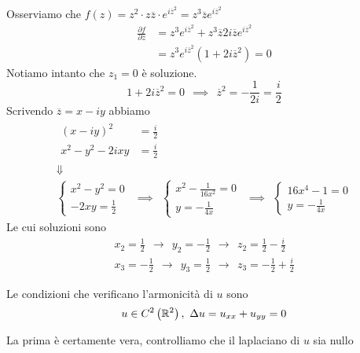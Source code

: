 Osserviamo che $f\left(z\right) = z^{2} \cdot z\overline{z} \cdot e^{i\overline{z}^{2}} = z^{3}\overline{z} e^{i\overline{z}^{2}}$
\begin{align*}
\frac{\partial f}{\partial \overline{z}} & = z^{3} e^{i\overline{z}^{2}} + z^{3}\overline{z} 2i\overline{z} e^{i\overline{z}^{2}}\\
 & = z^{3} e^{i\overline{z}^{2}}\left(1 + 2i\overline{z}^{2}\right) = 0
\end{align*}
Notiamo intanto che $z_{1} = 0$ è soluzione.
\begin{equation*}
1 + 2i\overline{z}^{2} = 0\ \ \implies \ \ \overline{z}^{2} = - \frac{1}{2i} = \frac{i}{2}
\end{equation*}
Scrivendo $\overline{z} = x - iy$ abbiamo
\begin{gather*}
\begin{aligned}
\left(x - iy\right)^{2} & = \frac{i}{2}\\
x^{2} - y^{2} - 2ixy & = \frac{i}{2}
\end{aligned}\\
\Downarrow \\
\begin{cases}
x^{2} - y^{2} = 0\\
- 2xy = \frac{1}{2}
\end{cases} \ \ \implies \ \ \begin{cases}
x^{2} - \frac{1}{16x^{2}} = 0\\
y = -\frac{1}{4x}
\end{cases} \ \ \implies \ \ \begin{cases}
16x^{4} - 1 = 0\\
y = -\frac{1}{4x}
\end{cases}
\end{gather*}
Le cui soluzioni sono
\begin{gather*}
x_{2} = \frac{1}{2} \ \ \rightarrow \ \ y_{2} = - \frac{1}{2} \ \ \rightarrow \ \ z_{2} = \frac{1}{2} - \frac{i}{2}\\
x_{3} = - \frac{1}{2} \ \ \rightarrow \ \ y_{3} = \frac{1}{2} \ \ \rightarrow \ \ z_{3} = - \frac{1}{2} + \frac{i}{2}
\end{gather*}
\Soluzione
\begin{defn}
Le condizioni che verificano l'armonicità di $u$ sono
\begin{equation}
u\in C^{2}\left(\RR ^{2}\right) ,\ \Delta u = u_{xx} + u_{yy} = 0
\end{equation}
\end{defn}
La prima è certamente vera, controlliamo che il laplaciano di $u$ sia nullo
